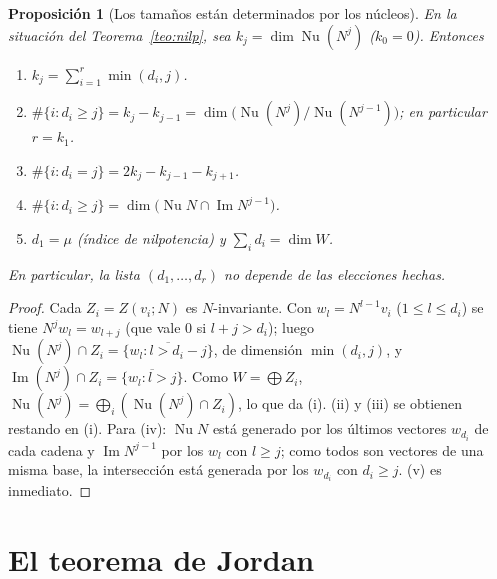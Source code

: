 \documentclass{article}
\DeclareMathOperator{\Ima}{Im}
\newcommand{\gen}[1]{\overline{\{#1\}}}          %
\DeclareMathOperator{\Nu}{Nu}
\theoremstyle{plain}
\newtheorem{proposicion}[teorema]{Proposición}
\theoremstyle{definition}
\theoremstyle{remark}
\begin{document}
\begin{proposicion}[Los tamaños están determinados por los núcleos]\label{prop:tamanos}
    En la situación del Teorema~\ref{teo:nilp}, sea \(k_j=\dim\Nu(N^j)\) (\(k_0=0\)). Entonces
    \begin{enumerate}[label=(\roman*)]
        \item \(k_j=\sum_{i=1}^r\min(d_i,j)\).
        \item \(\#\{i:d_i\ge j\}=k_j-k_{j-1}=\dim\big(\Nu(N^j)/\Nu(N^{j-1})\big)\); en particular \(r=k_1\).
        \item \(\#\{i:d_i=j\}=2k_j-k_{j-1}-k_{j+1}\).
        \item \(\#\{i:d_i\ge j\}=\dim\big(\Nu N\cap\Ima N^{j-1}\big)\).
        \item \(d_1=\mu\) (índice de nilpotencia) y \(\sum_id_i=\dim W\).
    \end{enumerate}
    En particular, la lista \((d_1,\dots,d_r)\) no depende de las elecciones hechas.
\end{proposicion}
\begin{proof}
    Cada \(Z_i=Z(v_i;N)\) es \(N\)-invariante. Con \(w_l=N^{l-1}v_i\) (\(1\le l\le d_i\)) se tiene \(N^jw_l=w_{l+j}\) (que vale \(0\) si \(l+j>d_i\)); luego \(\Nu(N^j)\cap Z_i=\gen{w_l:l>d_i-j}\), de dimensión \(\min(d_i,j)\), y \(\Ima(N^j)\cap Z_i=\gen{w_l:l>j}\). Como \(W=\bigoplus Z_i\), \(\Nu(N^j)=\bigoplus_i(\Nu(N^j)\cap Z_i)\), lo que da (i). (ii) y (iii) se obtienen restando en (i). Para (iv): \(\Nu N\) está generado por los últimos vectores \(w_{d_i}\) de cada cadena y \(\Ima N^{j-1}\) por los \(w_l\) con \(l\ge j\); como todos son vectores de una misma base, la intersección está generada por los \(w_{d_i}\) con \(d_i\ge j\). (v) es inmediato.
\end{proof}

\section{El teorema de Jordan}
\end{document}
